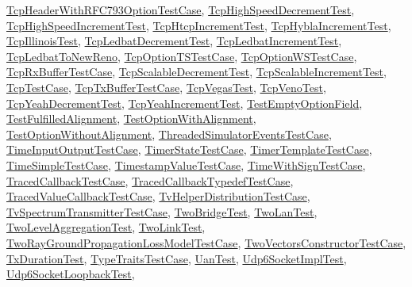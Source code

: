 \hyperlink{classTcpHeaderWithRFC793OptionTestCase}{Tcp\+Header\+With\+R\+F\+C793\+Option\+Test\+Case}, \hyperlink{classTcpHighSpeedDecrementTest}{Tcp\+High\+Speed\+Decrement\+Test}, \hyperlink{classTcpHighSpeedIncrementTest}{Tcp\+High\+Speed\+Increment\+Test}, \hyperlink{classTcpHtcpIncrementTest}{Tcp\+Htcp\+Increment\+Test}, \hyperlink{classTcpHyblaIncrementTest}{Tcp\+Hybla\+Increment\+Test}, \hyperlink{classTcpIllinoisTest}{Tcp\+Illinois\+Test}, \hyperlink{classTcpLedbatDecrementTest}{Tcp\+Ledbat\+Decrement\+Test}, \hyperlink{classTcpLedbatIncrementTest}{Tcp\+Ledbat\+Increment\+Test}, \hyperlink{classTcpLedbatToNewReno}{Tcp\+Ledbat\+To\+New\+Reno}, \hyperlink{classTcpOptionTSTestCase}{Tcp\+Option\+T\+S\+Test\+Case}, \hyperlink{classTcpOptionWSTestCase}{Tcp\+Option\+W\+S\+Test\+Case}, \hyperlink{classTcpRxBufferTestCase}{Tcp\+Rx\+Buffer\+Test\+Case}, \hyperlink{classTcpScalableDecrementTest}{Tcp\+Scalable\+Decrement\+Test}, \hyperlink{classTcpScalableIncrementTest}{Tcp\+Scalable\+Increment\+Test}, \hyperlink{classTcpTestCase}{Tcp\+Test\+Case}, \hyperlink{classTcpTxBufferTestCase}{Tcp\+Tx\+Buffer\+Test\+Case}, \hyperlink{classTcpVegasTest}{Tcp\+Vegas\+Test}, \hyperlink{classTcpVenoTest}{Tcp\+Veno\+Test}, \hyperlink{classTcpYeahDecrementTest}{Tcp\+Yeah\+Decrement\+Test}, \hyperlink{classTcpYeahIncrementTest}{Tcp\+Yeah\+Increment\+Test}, \hyperlink{classTestEmptyOptionField}{Test\+Empty\+Option\+Field}, \hyperlink{classTestFulfilledAlignment}{Test\+Fulfilled\+Alignment}, \hyperlink{classTestOptionWithAlignment}{Test\+Option\+With\+Alignment}, \hyperlink{classTestOptionWithoutAlignment}{Test\+Option\+Without\+Alignment}, \hyperlink{classThreadedSimulatorEventsTestCase}{Threaded\+Simulator\+Events\+Test\+Case}, \hyperlink{classTimeInputOutputTestCase}{Time\+Input\+Output\+Test\+Case}, \hyperlink{classTimerStateTestCase}{Timer\+State\+Test\+Case}, \hyperlink{classTimerTemplateTestCase}{Timer\+Template\+Test\+Case}, \hyperlink{classTimeSimpleTestCase}{Time\+Simple\+Test\+Case}, \hyperlink{classTimestampValueTestCase}{Timestamp\+Value\+Test\+Case}, \hyperlink{classTimeWithSignTestCase}{Time\+With\+Sign\+Test\+Case}, \hyperlink{classTracedCallbackTestCase}{Traced\+Callback\+Test\+Case}, \hyperlink{classTracedCallbackTypedefTestCase}{Traced\+Callback\+Typedef\+Test\+Case}, \hyperlink{classTracedValueCallbackTestCase}{Traced\+Value\+Callback\+Test\+Case}, \hyperlink{classTvHelperDistributionTestCase}{Tv\+Helper\+Distribution\+Test\+Case}, \hyperlink{classTvSpectrumTransmitterTestCase}{Tv\+Spectrum\+Transmitter\+Test\+Case}, \hyperlink{classTwoBridgeTest}{Two\+Bridge\+Test}, \hyperlink{classTwoLanTest}{Two\+Lan\+Test}, \hyperlink{classTwoLevelAggregationTest}{Two\+Level\+Aggregation\+Test}, \hyperlink{classTwoLinkTest}{Two\+Link\+Test}, \hyperlink{classTwoRayGroundPropagationLossModelTestCase}{Two\+Ray\+Ground\+Propagation\+Loss\+Model\+Test\+Case}, \hyperlink{classTwoVectorsConstructorTestCase}{Two\+Vectors\+Constructor\+Test\+Case}, \hyperlink{classTxDurationTest}{Tx\+Duration\+Test}, \hyperlink{classTypeTraitsTestCase}{Type\+Traits\+Test\+Case}, \hyperlink{classUanTest}{Uan\+Test}, \hyperlink{classUdp6SocketImplTest}{Udp6\+Socket\+Impl\+Test}, \hyperlink{classUdp6SocketLoopbackTest}{Udp6\+Socket\+Loopback\+Test}, 